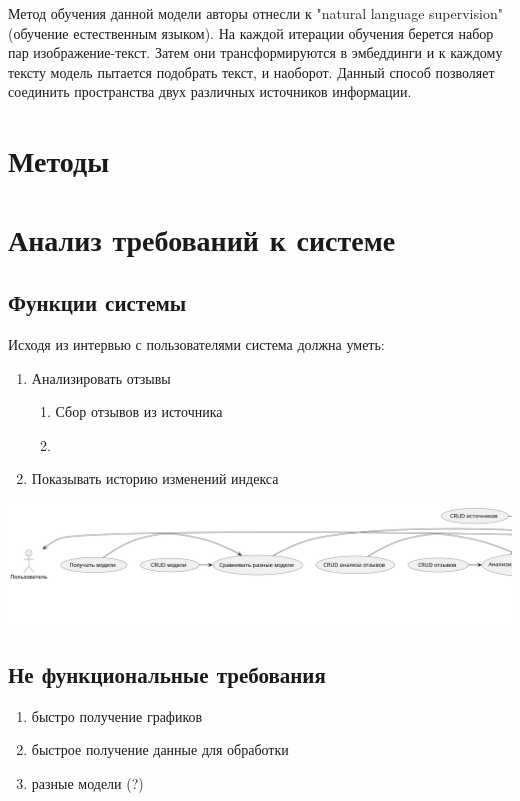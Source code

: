 \documentclass[PI, VKR]{HSEUniversity}
\begin{document}
Метод обучения данной модели авторы отнесли к "natural language supervision" (обучение естественным языком). На каждой итерации обучения берется набор пар изображение-текст. Затем они трансформируются в эмбеддинги и к каждому тексту модель пытается подобрать текст, и наоборот. Данный способ позволяет соединить пространства двух различных источников информации.
\section{Методы}
\label{sec:org6a5448d}
\section{Анализ требований к системе}
\label{sec:org39401cb}
\subsection{Функции системы}
\label{sec:orgbb13932}
Исходя из интервью с пользователями система должна уметь:
\begin{enumerate}
\item Анализировать отзывы
\begin{enumerate}
\item Сбор отзывов из источника
\item
\end{enumerate}
\item Показывать историю изменений индекса
\end{enumerate}
\begin{center}
\includegraphics[width=.9\linewidth]{./img/plantuml/usecasefull.png}
\end{center}
\subsection{Не функциональные требования}
\label{sec:orge399ad9}
\begin{enumerate}
\item быстро получение графиков
\item быстрое получение данные для обработки
\item разные модели (?)
\end{enumerate}
\end{document}
